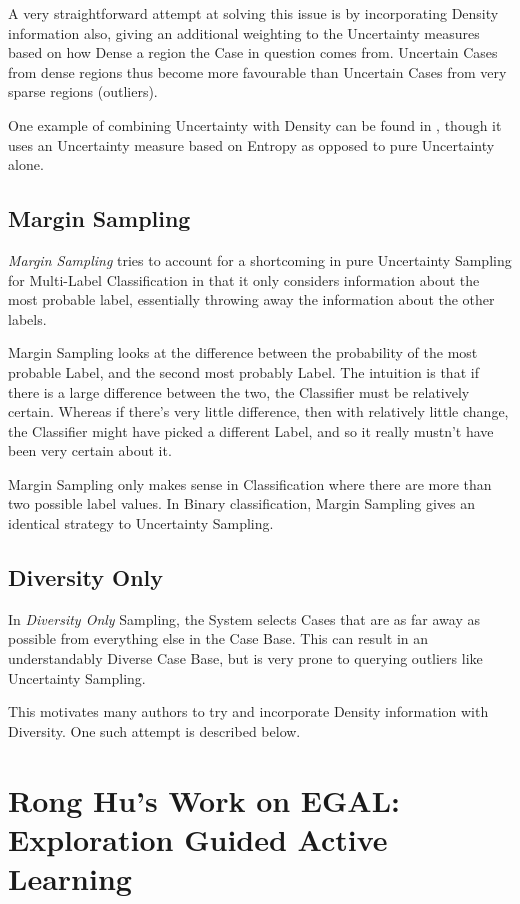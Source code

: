 \documentclass[a4paper,11pt]{report}
\begin{document}
A very straightforward attempt at solving this issue is by incorporating Density information also, giving an additional weighting to the Uncertainty measures based on how Dense a region the Case in question comes from. Uncertain Cases from dense regions thus become more favourable than Uncertain Cases from very sparse regions (outliers).

One example of combining Uncertainty with Density can be found in \citet{Zhu2008}, though it uses an Uncertainty measure based on Entropy as opposed to pure Uncertainty alone.

\subsection{Margin Sampling}

\emph{Margin Sampling} tries to account for a shortcoming in pure Uncertainty Sampling for Multi-Label Classification in that it only considers information about the most probable label, essentially throwing away the information about the other labels.

Margin Sampling looks at the difference between the probability of the most probable Label, and the second most probably Label. The intuition is that if there is a large difference between the two, the Classifier must be relatively certain. Whereas if there's very little difference, then with relatively little change, the Classifier might have picked a different Label, and so it really mustn't have been very certain about it.

Margin Sampling only makes sense in Classification where there are more than two possible label values. In Binary classification, Margin Sampling gives an identical strategy to Uncertainty Sampling.

\subsection{Diversity Only}
In \emph{Diversity Only} Sampling, the System selects Cases that are as far away as possible from everything else in the Case Base. This can result in an understandably Diverse Case Base, but is very prone to querying outliers like Uncertainty Sampling.

This motivates many authors to try and incorporate Density information with Diversity. One such attempt is described below.

\section{Rong Hu's Work on EGAL: Exploration Guided Active Learning}
\end{document}
